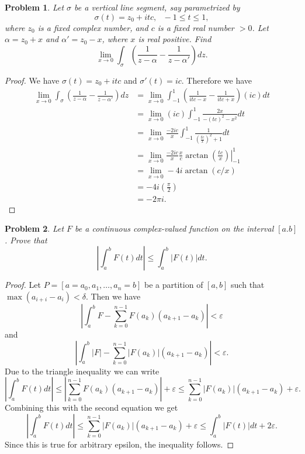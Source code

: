 \documentclass{article}
\newtheorem{problem}{Problem}
\begin{document}
\begin{problem}
Let $\sigma$ be a vertical line segment, say parametrized by
\[
\sigma(t) = z_0 + itc, \text{ } -1 \leq t \leq 1,
\]
where $z_0$ is a fixed complex number, and $c$ is a fixed real number $> 0$. Let $\alpha = z_0 + x$ and $\alpha' = z_0 - x$, where $x$ is real positive. Find
\[
\lim_{x \rightarrow 0} \int_{\sigma} \left ( \frac{1}{z - \alpha} - \frac{1}{z - \alpha'} \right ) dz.
\]
\end{problem}
\begin{proof}
We have $\sigma(t) = z_0 + itc$ and $\sigma'(t) = ic$. Therefore we have
\begin{align*}
\lim_{x \rightarrow 0} \int_{\sigma} \left ( \frac{1}{z - \alpha} - \frac{1}{z - \alpha'} \right ) dz 
&= \lim_{x \rightarrow 0} \int_{-1}^{1} \left ( \frac{1}{itc - x} - \frac{1}{itc + x} \right ) (ic) dt \\
&= \lim_{x \rightarrow 0} (ic) \int_{-1}^{1} \frac{2x}{-(tc)^2 - x^2} dt \\
&= \lim_{x \rightarrow 0} \frac{-2ic}{x} \int_{-1}^{1} \frac{1}{\left ( \frac{tc}{x} \right )^2 + 1} dt \\
&= \lim_{x \rightarrow 0} \left. \frac{-2ic}{x} \frac{x}{c} \arctan \left (\frac{tc}{x} \right ) \right |_{-1}^{1} \\
&= \lim_{x \rightarrow 0} -4i\arctan(c/x) \\
&= -4i \left ( \frac{\pi}{2} \right ) \\
&= -2 \pi i.
\end{align*}
\end{proof}

\begin{problem}
Let $F$ be a continuous complex-valued function on the interval $[a.b]$. Prove that
\[
\left | \int_a^b F(t) dt \right | \leq \int_a^b |F(t)| dt.
\]
\end{problem}
\begin{proof}
Let $P = [a = a_0, a_1, \dots , a_n = b]$ be a partition of $[a,b]$ such that $\max (a_{i+i}-a_i) < \delta$. Then we have
\[
\left | \int_a^b F - \sum_{k=0}^{n-1} F(a_k)(a_{k+1} - a_k) \right | < \varepsilon
\]
and
\[
\left | \int_a^b |F| - \sum_{k=0}^{n-1} |F(a_k)|(a_{k+1} - a_k) \right | < \varepsilon.
\]
Due to the triangle inequality we can write
\[
\left | \int_a^b F(t) dt \right | \leq \left | \sum_{k=0}^{n-1} F(a_k)(a_{k+1}-a_k) \right | + \varepsilon \leq \sum_{k=0}^{n-1} |F(a_k)|(a_{k+1}-a_k) + \varepsilon.
\]
Combining this with the second equation we get
\[
\left | \int_a^b F(t) dt \right | \leq \sum_{k=0}^{n-1} |F(a_k)|(a_{k+1} - a_k) + \varepsilon \leq \int_a^b |F(t)|dt + 2\varepsilon.
\]
Since this is true for arbitrary epsilon, the inequality follows.
\end{proof}
\end{document}
